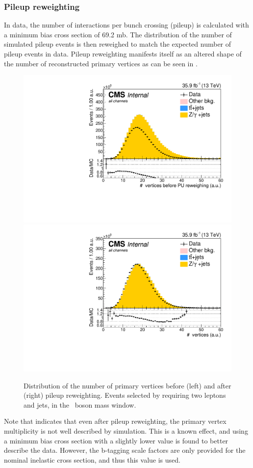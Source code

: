 \subsubsection*{Pileup reweighting}
In data, the number of interactions per bunch crossing (pileup) is calculated with a minimum bias cross section of 69.2 mb. The distribution of the number of simulated pileup events is then reweighed to match the expected number of pileup events in data. Pileup reweighting manifests itself as an altered shape of the number of reconstructed primary vertices as can be seen in .

\begin{figure}[htbp]
	\centering	
	\includegraphics[width=0.49\linewidth]{5_Eventselection/Figures/Reweighing/2lepcontrol_dilep_NbOfVertices_bfPU_all_Stack}
	\includegraphics[width=0.49\linewidth]{5_Eventselection/Figures/Reweighing/2lepcontrol_dilep_NbOfVertices_all_Stack}
	\caption{Distribution of the number of primary vertices before (left) and after (right) pileup reweighting. Events selected by requiring two leptons and jets, in the \PZ\ boson mass window.}
	\label{fig:nbvertices}
\end{figure}

Note that  indicates that even after pileup reweighting, the primary vertex multiplicity is not well described by simulation. This is a known effect, and using  a minimum bias cross section with a slightly lower value is found to better describe the data. However, the b-tagging scale factors are only provided for the nominal inelastic cross section, and thus this value is used.


